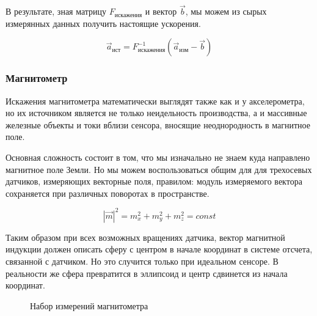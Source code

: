 \documentclass[a4paper]{article}
\begin{document}
В результате, зная матрицу $F_{\text{искажения}}$ и вектор $\vec{b}$, мы можем из сырых измерянных данных получить настоящие ускорения.

$$ \vec{a}_{\text{ист}} = F_{\text{искажения}}^{-1}(\vec{a}_{\text{изм}} - \vec{b})  $$

\subsubsection{Магнитометр}

Искажения магнитометра математически выглядят также как и у акселерометра, но их источником является не только неидельность производства, а и массивные железные объекты и токи вблизи сенсора, вносящие неоднородность в магнитное поле.

Основная сложность состоит в том, что мы изначально не знаем куда направлено магнитное поле Земли. Но мы можем воспользоваться общим для для трехосевых датчиков, измеряющих векторные поля, правилом: модуль измеряемого вектора сохраняется при различных поворотах в пространстве.

$$ |\vec{m}|^2 = m_x^2 + m_y^2 + m_z^2 = const $$

Таким образом при всех возможных вращениях датчика, вектор магнитной индукции должен описать сферу с центром в начале координат в системе отсчета, связанной с датчиком. Но это случится только при идеальном сенсоре. В реальности же сфера превратится в эллипсоид и центр сдвинется из начала координат.

\begin{figure}[h!]
	\caption{Набор измерений магнитометра}
	\label{fig:compass_points}
\end{figure}
\end{document}
